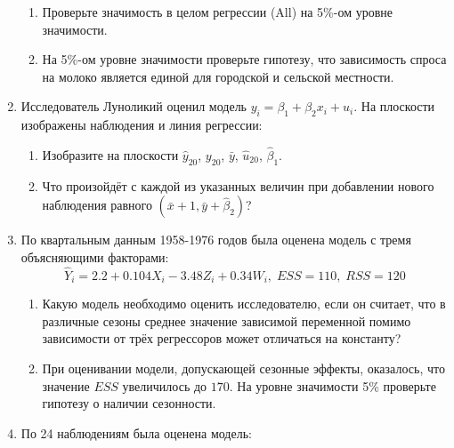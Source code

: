 \documentclass[12pt]{article}\usepackage[]{graphicx}\usepackage[svgnames]{xcolor}
\def \hb{\hat{\beta}}
\begin{document}
\begin{enumerate}
\begin{enumerate}
\item Проверьте значимость в целом регрессии (All) на 5\%-ом уровне значимости.
\item На 5\%-ом уровне значимости проверьте гипотезу, что зависимость спроса на молоко является единой для городской и сельской местности.
\end{enumerate}

\newpage

\item Исследователь Луноликий оценил модель $y_i = \beta_1 + \beta_2 x_i + u_i$. На плоскости изображены наблюдения и линия регрессии:

\begin{center}
\begin{figure}
\begin{tikzpicture}[scale = 0.025]

\end{tikzpicture}
\end{figure}
\end{center}

\begin{enumerate}
\item Изобразите на плоскости $\hat y_{20}$, $y_{20}$, $\bar y$, $\hat u_{20}$, $\hb_1$.
\item Что произойдёт с каждой из указанных величин при добавлении нового наблюдения равного $(\bar x + 1, \bar y + \hb_2)$?
\end{enumerate}




\newpage
\item По квартальным данным 1958-1976 годов была оценена модель с тремя объясняющими факторами:
\[
\hat Y_i = 2.2 + 0.104 X_i - 3.48 Z_i + 0.34 W_i, \; ESS = 110, \; RSS = 120
\]

\begin{enumerate}
\item Какую модель необходимо оценить исследователю, если он считает, что в различные сезоны среднее значение зависимой переменной помимо зависимости от трёх регрессоров может отличаться на константу?
\item При оценивании модели, допускающей сезонные эффекты, оказалось, что значение $ESS$ увеличилось до $170$.
На уровне значимости 5\% проверьте гипотезу о наличии сезонности.
\end{enumerate}



\item По 24 наблюдениям была оценена модель:


\end{enumerate}
\end{document}
